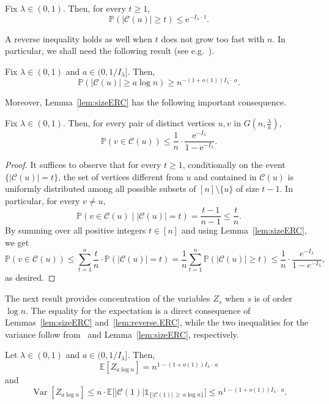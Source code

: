 \documentclass[AHL,Unicode,longabstracts,published]{cedram}
\newcommand{\e}{\mathrm{e}}
\renewcommand{\Pr}{\mathbb{P}}
\newcommand{\bbE}{\mathbb{E}}
\newcommand{\cC}{\mathcal{C}}
\DeclareMathOperator{\rVar}{Var}
\begin{document}
\begin{lemm}\label{lem:sizeERC}
Fix $\lambda\in (0,1)$. Then, for every $t\ge 1$,
\[
\Pr(|\cC(u)|\ge t) \le \e^{- I_\lambda\cdot\, t}.
\]
\end{lemm}

A reverse inequality holds as well when $t$ does not grow too fast with $n$. In particular, we shall need the following result (see e.g.~\cite[(4.3.34) and (4.3.37)]{Hof16}).

\begin{lemm}\label{lem:reverse.ERC}
Fix $\lambda\in(0,1)$ and $a\in (0,1/I_\lambda]$. Then,
\[
\Pr(|\cC(u)|\ge a\log n) \ge n^{-(1+o(1))I_\lambda\cdot\, a}.
\]
\end{lemm}

Moreover, Lemma~\ref{lem:sizeERC} has the following important consequence.

\begin{coro}\label{cor:connectionER}
Fix $\lambda\in (0,1)$. Then, for every pair of distinct vertices $u,v$ in $G(n,\frac \lambda n)$,
\[
\Pr(v\in \cC(u)) \le \frac 1n \cdot \frac {\e^{-I_\lambda}}{1-\e^{-I_\lambda}}.
\]
\end{coro}
\begin{proof}
It suffices to observe that for every $t\ge 1$, conditionally on the event $\{|\cC(u)|=t\}$, the set of vertices different from $u$ and contained in $\cC(u)$ is uniformly distributed among all possible subsets of $[n]\setminus \{u\}$ of size $t-1$. In particular, for every $v\neq u$,
\begin{equation}\label{prob.cond.connect}
\Pr(v\in \cC(u) \mid |\cC(u)|= t) = \frac{t-1}{n-1}\le \frac{t}{n}.
\end{equation}
By summing over all positive integers $t\in [n]$ and using Lemma~\ref{lem:sizeERC}, we get
\[
\Pr(v\in \cC(u)) \le \sum_{t = 1}^n \frac{t}{n}\cdot \Pr(|\cC(u)|= t) = \frac 1n \sum_{t = 1}^n\Pr(|\cC(u)|\ge t) \le \frac 1n \cdot \frac {e^{-I_\lambda}}{1-e^{-I_\lambda}},
\]
as desired.
\end{proof}

The next result provides concentration of the variables $Z_s$ when $s$ is of order $\log n$. The equality for the expectation is a direct consequence of Lemmas~\ref{lem:sizeERC} and~\ref{lem:reverse.ERC}, while the two inequalities for the variance follow from~\cite[Proposition~4.7]{Hof16} and Lemma~\ref{lem:sizeERC}, respectively.

\begin{lemm}\label{lem:clustersize}
Let $\lambda\in (0,1)$ and $a\in (0,1/I_\lambda]$. Then,
\[
\bbE\left[Z_{a\log n}\right] = n^{1-(1+o(1)) I_\lambda\cdot\, a}
\]
and
\[
\rVar[Z_{a\log n}] \le n\cdot \bbE\big[|\cC(1)|\mathds{1}_{\{|\cC(1)|\,\ge\, a\log n\}}\big]\le n^{1-(1+o(1)) I_\lambda\cdot\, a}.
\]
\end{lemm}
\end{document}
